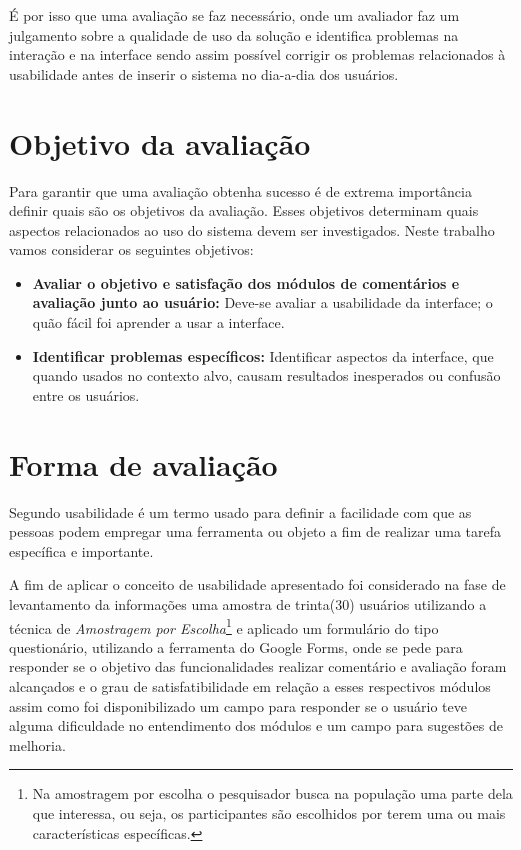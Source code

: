 \documentclass[12pt, a4paper]{report}
\begin{document}
É por isso que uma avaliação se faz necessário, onde um  avaliador faz um julgamento sobre a qualidade de uso da solução e identifica problemas na interação e na interface sendo assim possível corrigir os problemas relacionados à usabilidade antes de inserir o sistema no dia-a-dia dos usuários.

\section{Objetivo da avaliação }
Para garantir que uma avaliação obtenha sucesso é de extrema importância definir quais são os objetivos da avaliação. Esses objetivos determinam quais aspectos relacionados ao uso do sistema devem ser investigados. Neste trabalho vamos considerar os seguintes objetivos:
\begin{itemize}
 
 \item{\textbf{Avaliar o objetivo e satisfação dos módulos de comentários e avaliação junto ao usuário:}} Deve-se avaliar a usabilidade da interface; o quão fácil foi aprender a usar a interface.
 \item{\textbf{Identificar problemas específicos:}} Identificar aspectos da interface, que quando usados no contexto alvo, causam resultados inesperados ou confusão entre os usuários.
\end{itemize}

\section{Forma de avaliação}

Segundo \cite{polson1992cognitive} usabilidade é um termo usado para definir a facilidade com que as pessoas podem empregar uma ferramenta ou objeto a fim de realizar uma tarefa específica e importante. 

A fim de aplicar o conceito de usabilidade apresentado foi considerado na fase de levantamento da informações uma amostra de trinta(30) usuários utilizando a técnica de \textit{Amostragem por Escolha}\footnote{ Na amostragem por escolha o pesquisador busca na população uma parte dela que interessa, ou seja, os participantes são escolhidos por terem uma ou mais características específicas.} e aplicado um formulário do tipo questionário, utilizando a ferramenta do Google Forms, onde se pede para responder se o objetivo das funcionalidades realizar comentário e avaliação foram alcançados e o  grau de satisfatibilidade em relação a esses respectivos módulos assim como foi disponibilizado um campo para responder se o usuário teve alguma dificuldade no entendimento dos módulos e um campo para sugestões de melhoria.
\end{document}

